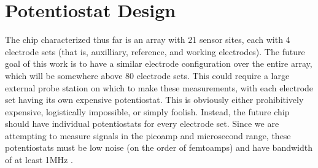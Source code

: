 \chapter{Potentiostat Design}

The chip characterized thus far is an array with 21 sensor sites, each with 4 electrode sets (that is, auxilliary, reference, and working electrodes). The future goal of this work is to have a similar electrode configuration over the entire array, which will be somewhere above 80 electrode sets. This could require a large external probe station on which to make these measurements, with each electrode set having its own expensive potentiostat. This is obviously either prohibitively expensive, logistically impossible, or simply foolish. Instead, the future chip should have individual potentiostats for every electrode set. Since we are attempting to measure signals in the picoamp and microsecond range, these potentiostats must be low noise (on the order of femtoamps) and have bandwidth of at least 1MHz \cite{mosharok2005AEERA}.
